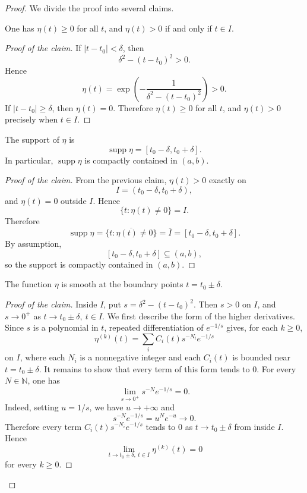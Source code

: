 ﻿\documentclass[12pt]{article}
\begin{document}
\begin{proof}
We divide the proof into several claims.

\begin{claim}\label{C.4}
One has $\eta(t) \geq 0$ for all $t$, and $\eta(t) > 0$ if and only if $t \in I$.
\end{claim}

\begin{proof}[Proof of the claim]
If $|t - t_0| < \delta$, then
\[
 \delta^2 - (t - t_0)^2 > 0.
\]
Hence
\[
 \eta(t)
 =
 \exp\left(-\frac{1}{\delta^2 - (t - t_0)^2}\right) > 0.
\]
If $|t - t_0| \geq \delta$, then $\eta(t) = 0$. Therefore $\eta(t) \geq 0$ for all $t$, and $\eta(t) > 0$ precisely when $t \in I$.
\end{proof}

\begin{claim}\label{C.5}
The support of $\eta$ is
\[
 \operatorname{supp}\eta = [t_0 - \delta, t_0 + \delta].
\]
In particular, $\operatorname{supp}\eta$ is compactly contained in $(a, b)$.
\end{claim}

\begin{proof}[Proof of the claim]
From the previous claim, $\eta(t) > 0$ exactly on
\[
 I = (t_0 - \delta, t_0 + \delta),
\]
and $\eta(t) = 0$ outside $I$. Hence
\[
 \{t:\eta(t) \neq 0\} = I.
\]
Therefore
\[
 \operatorname{supp}\eta
 =
 \overline{\{t:\eta(t) \neq 0\}}
 =
 \overline I
 =
 [t_0 - \delta, t_0 + \delta].
\]
By assumption,
\[
 [t_0 - \delta, t_0 + \delta] \subseteq (a, b),
\]
so the support is compactly contained in $(a, b)$.
\end{proof}
\begin{claim}\label{C.6}
The function $\eta$ is smooth at the boundary points $t = t_0 \pm \delta$.
\end{claim}
\begin{proof}[Proof of the claim]
Inside $I$, put
$
 s = \delta^2 - (t - t_0)^2.
$
Then $s > 0$ on $I$, and $s \to 0^+$ as $t \to t_0 \pm \delta,\ t \in I$.
We first describe the form of the higher derivatives. Since $s$ is a polynomial in $t$, repeated differentiation of $e^{-1/s}$ gives, for each $k \geq 0$,
\[
 \eta^{(k)}(t)
 =
 \sum_i C_i(t)s^{-N_i}e^{-1/s}
\]
on $I$, where each $N_i$ is a nonnegative integer and each $C_i(t)$ is bounded near $t = t_0 \pm \delta$. 
It remains to show that every term of this form tends to $0$. For every $N \in \mathbb N$, one has
\[
 \lim_{s \to 0^+}s^{-N}e^{-1/s} = 0.
\]
Indeed, setting $u = 1/s$, we have $u \to + \infty$ and
\[
 s^{-N}e^{-1/s} = u^Ne^{-u} \to 0.
\]
Therefore every term $C_i(t)s^{-N_i}e^{-1/s}$ tends to $0$ as $t \to t_0 \pm \delta$ from inside $I$. Hence
\[
 \lim_{t \to t_0 \pm \delta,\ t \in I}\eta^{(k)}(t) = 0
\]
for every $k \geq 0$.


\end{proof}
\end{proof}
\end{document}
